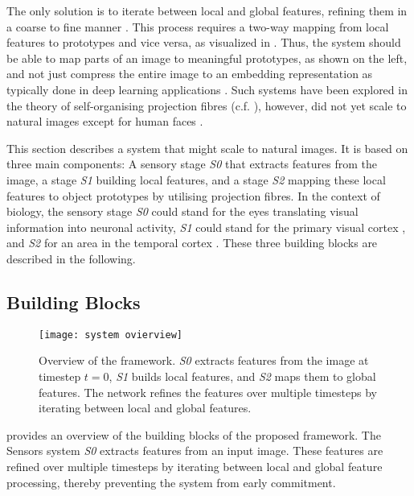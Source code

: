 The only solution is to iterate between local and global features, refining them in a coarse to fine manner . This process requires a two-way mapping from local features to prototypes and vice versa, as visualized in .
Thus, the system should be able to map parts of an image to meaningful prototypes, as shown on the left, and not just compress the entire image to an embedding representation as typically done in deep learning applications .
Such systems have been explored in the theory of self-organising projection fibres (c.f. ), however, did not yet scale to natural images except for human faces \cite{wolfrum_recurrent_2008}.

This section describes a system that might scale to natural images.
It is based on three main components: A sensory stage \emph{S0} that extracts features from the image, a stage \emph{S1} building local features, and a stage \emph{S2} mapping these local features to object prototypes by utilising projection fibres.
In the context of biology, the sensory stage \emph{S0} could stand for the eyes translating visual information into neuronal activity, \emph{S1} could stand for the primary visual cortex , and \emph{S2} for an area in the temporal cortex .
These three building blocks are described in the following.











\subsection{Building Blocks}
\begin{figure}[h]
    \centering
    \texttt{[image: system ovierview]}
    \caption[Overview of the framework]{Overview of the framework. \emph{S0} extracts features from the image at timestep $t=0$, \emph{S1} builds local features, and \emph{S2} maps them to global features. The network refines the features over multiple timesteps by iterating between local and global features.}
\end{figure}

 provides an overview of the building blocks of the proposed framework. The Sensors system \emph{S0} extracts features from an input image. These features are refined over multiple timesteps by iterating between local and global feature processing, thereby preventing the system from early commitment.

